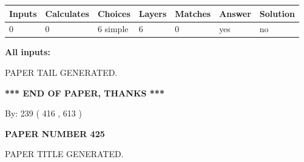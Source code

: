 \documentclass{ctexart}
\begin{document}
 
   
   
   
   
\noindent\begin{tabular}{|l|l|l|l|l|l|l|}
 \hline
Inputs & Calculates & Choices & Layers & Matches & Answer & Solution \\ \hline
 0  & 
 0  & 
 6
  simple  
  & 
 6  & 
 0  & 
  yes & 
  no 
  \\ \hline
 \end{tabular}
   
   
   
   
\noindent{}
   
   
   
   
\noindent\vspace{0.1in}\hspace{-0.08in} {\textbf{\Large{All inputs: }}}
   
   
   
   
   
   
 \vspace{0.2in}
 
   
   
\vspace{2.0in} PAPER TAIL GENERATED.
   
   
   
   
\vspace{1.0in} 
{\textbf{\large{ *** END OF PAPER, THANKS *** }}} 
   
   
\hspace{1.0in} By: 
 239 ( 416 ,  613 )
   
   
   
   
\newpage 
\setcounter{page}{ 
   425001 } 
   
   
   
   
 {\textbf{ \Large{ PAPER NUMBER  425  }}}
   
   
\vspace{0.2in}
   
   
   
   
   
   
   
   
 \vspace{0.2in}
 
 
 
 
   
   
 PAPER TITLE GENERATED.
   
\end{document}
